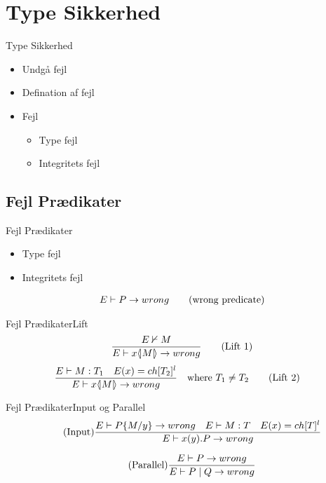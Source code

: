 \section{Type Sikkerhed}
\begin{frame}{Type Sikkerhed}
\begin{itemize}
\item Undgå fejl
\item Defination af fejl
\item Fejl 	\begin{itemize}
				\item Type fejl
				\item Integritets fejl
			\end{itemize}

\end{itemize}
\end{frame}

\subsection{Fejl Prædikater}
\begin{frame}{Fejl Prædikater}
\begin{itemize}
	\item Type fejl
	\item Integritets fejl
\end{itemize}
\begin{align}
	E \vdash P \rightarrow wrong \tag{wrong predicate}
\end{align}
\end{frame}

\begin{frame}{Fejl Prædikater}{Lift}
\begin{align}
	\frac{E \nvdash M}{E \vdash x \langle \! | M | \! \rangle \rightarrow wrong} \tag{Lift 1}
\end{align}
\begin{align}
	\frac{E \vdash M:T_1 \quad E(x)=ch[T_2]^l}{E \vdash x \langle \! | M | \! \rangle \rightarrow wrong} &\quad \text{where}\ T_1 \neq T_2\tag{Lift 2}
\end{align}
\end{frame}

\begin{frame}{Fejl Prædikater}{Input og Parallel}
\begin{align}
	\tag{Input}\frac{E \vdash P\{ M/ y\} \rightarrow wrong \quad E \vdash M:T \quad E(x)= ch[T]^l} {E \vdash x(y).P \rightarrow wrong}
\end{align}

\begin{align}
	\tag{Parallel}\frac{E \vdash P \rightarrow wrong}{E \vdash P \mid Q \rightarrow wrong}
\end{align}
\end{frame}


